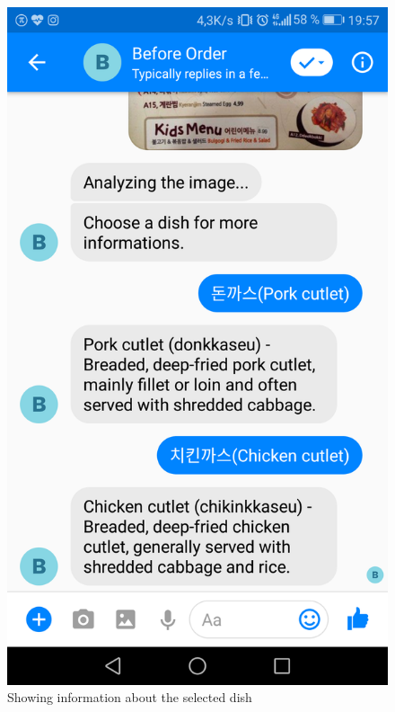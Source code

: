 \begin{figure}[htbp]
\centerline{\includegraphics[height=\custompicheight]{./pictures/facebook_result}}
\caption{Showing information about the selected dish}
\label{fig:Before Order_show_dish information}
\end{figure}
\FloatBarrier
